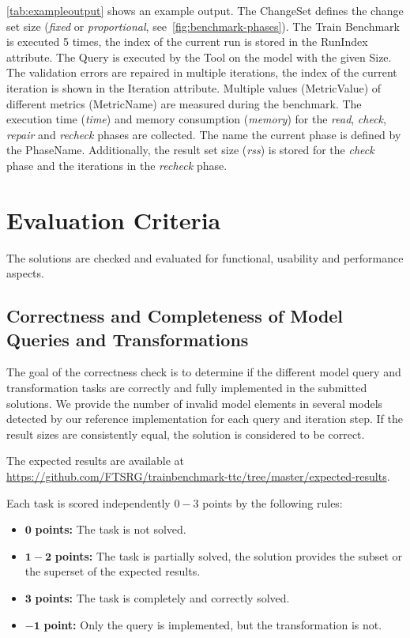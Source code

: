 \documentclass[submission,copyright,creativecommons]{eptcs}
\newcommand{\figref}[1]{\autoref{fig:#1}}
\begin{document}
\autoref{tab:exampleoutput} shows an example output. The \textsf{ChangeSet} defines the change set size (\emph{fixed} or \emph{proportional}, see~\figref{benchmark-phases}). The Train Benchmark is executed 5 times, the index of the current run is stored in the \textsf{RunIndex} attribute. The \textsf{Query} is executed by the \textsf{Tool} on the model with the given \textsf{Size}. The validation errors are repaired in multiple iterations, the index of the current iteration is shown in the \textsf{Iteration} attribute. Multiple values (\textsf{MetricValue}) of different metrics (\textsf{MetricName}) are measured during the benchmark. The execution time (\textit{time}) and memory consumption (\textit{memory}) for the \textit{read}, \textit{check}, \textit{repair} and \textit{recheck} phases are collected. The name the current phase is defined by the \textsf{PhaseName}. Additionally, the result set size (\textit{rss}) is stored for the \textit{check} phase and the iterations in the \textit{recheck} phase.


\section{Evaluation Criteria}

The solutions are checked and evaluated for functional, usability and performance aspects.

\subsection{Correctness and Completeness of Model Queries and Transformations}
The goal of the correctness check is to determine if the different model query and transformation tasks are correctly and fully implemented in the submitted solutions.
We provide the number of invalid model elements in several models detected by our reference implementation for each query and iteration step. If the result sizes are consistently equal, the solution is considered to be correct.

The expected results are available at \url{https://github.com/FTSRG/trainbenchmark-ttc/tree/master/expected-results}.

Each task is scored independently $0-3$ points by the following rules:
\begin{itemize}
	\item $\mathbf{0}$   \textbf{points:} The task is not solved.
	\item $\mathbf{1-2}$ \textbf{points:} The task is partially solved, the solution provides the subset or the superset of the expected results.
	\item $\mathbf{3}$   \textbf{points:} The task is completely and correctly solved.
	\item $\mathbf{-1}$  \textbf{point:} Only the query is implemented, but the transformation is not.
\end{itemize}
\end{document}
